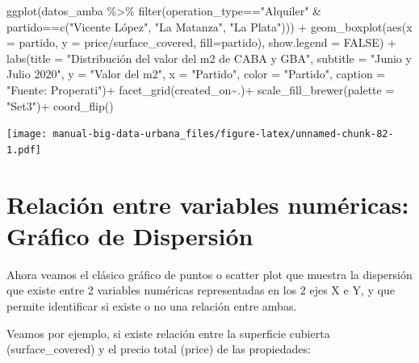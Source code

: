 \documentclass[
  spanish,
]{book}
\newenvironment{Shaded}{\begin{snugshade}}{\end{snugshade}}
\newcommand{\AttributeTok}[1]{\textcolor[rgb]{0.77,0.63,0.00}{#1}}
\newcommand{\ConstantTok}[1]{\textcolor[rgb]{0.00,0.00,0.00}{#1}}
\newcommand{\FunctionTok}[1]{\textcolor[rgb]{0.00,0.00,0.00}{#1}}
\newcommand{\NormalTok}[1]{#1}
\newcommand{\SpecialCharTok}[1]{\textcolor[rgb]{0.00,0.00,0.00}{#1}}
\newcommand{\StringTok}[1]{\textcolor[rgb]{0.31,0.60,0.02}{#1}}
\begin{document}
\begin{Shaded}
\begin{Highlighting}[]
\FunctionTok{ggplot}\NormalTok{(datos\_amba }\SpecialCharTok{\%\textgreater{}\%}
         \FunctionTok{filter}\NormalTok{(operation\_type}\SpecialCharTok{==}\StringTok{"Alquiler"} \SpecialCharTok{\&}\NormalTok{ partido}\SpecialCharTok{==}\FunctionTok{c}\NormalTok{(}\StringTok{"Vicente López"}\NormalTok{, }\StringTok{"La Matanza"}\NormalTok{, }\StringTok{"La Plata"}\NormalTok{))) }\SpecialCharTok{+}
  \FunctionTok{geom\_boxplot}\NormalTok{(}\FunctionTok{aes}\NormalTok{(}\AttributeTok{x =}\NormalTok{ partido, }\AttributeTok{y =}\NormalTok{ price}\SpecialCharTok{/}\NormalTok{surface\_covered, }\AttributeTok{fill=}\NormalTok{partido), }\AttributeTok{show.legend =} \ConstantTok{FALSE}\NormalTok{) }\SpecialCharTok{+}
  \FunctionTok{labs}\NormalTok{(}\AttributeTok{title =} \StringTok{"Distribución del valor del m2 de CABA y GBA"}\NormalTok{,}
       \AttributeTok{subtitle =} \StringTok{"Junio y Julio 2020"}\NormalTok{,}
       \AttributeTok{y =} \StringTok{"Valor del m2"}\NormalTok{,}
       \AttributeTok{x =} \StringTok{"Partido"}\NormalTok{,}
       \AttributeTok{color =} \StringTok{"Partido"}\NormalTok{,}
       \AttributeTok{caption =} \StringTok{"Fuente: Properati"}\NormalTok{)}\SpecialCharTok{+}
  \FunctionTok{facet\_grid}\NormalTok{(created\_on}\SpecialCharTok{\textasciitilde{}}\NormalTok{.)}\SpecialCharTok{+}
  \FunctionTok{scale\_fill\_brewer}\NormalTok{(}\AttributeTok{palette =} \StringTok{"Set3"}\NormalTok{)}\SpecialCharTok{+}
  \FunctionTok{coord\_flip}\NormalTok{()}
\end{Highlighting}
\end{Shaded}

\texttt{[image: manual-big-data-urbana\_files/figure-latex/unnamed-chunk-82-1.pdf]}

\hypertarget{relaciuxf3n-entre-variables-numuxe9ricas-gruxe1fico-de-dispersiuxf3n}{%
\section{Relación entre variables numéricas: Gráfico de Dispersión}\label{relaciuxf3n-entre-variables-numuxe9ricas-gruxe1fico-de-dispersiuxf3n}}

Ahora veamos el clásico gráfico de puntos o scatter plot que muestra la dispersión que existe entre 2 variables numéricas representadas en los 2 ejes X e Y, y que permite identificar si existe o no una relación entre ambas.

Veamos por ejemplo, si existe relación entre la superficie cubierta (surface\_covered) y el precio total (price) de las propiedades:
\end{document}
